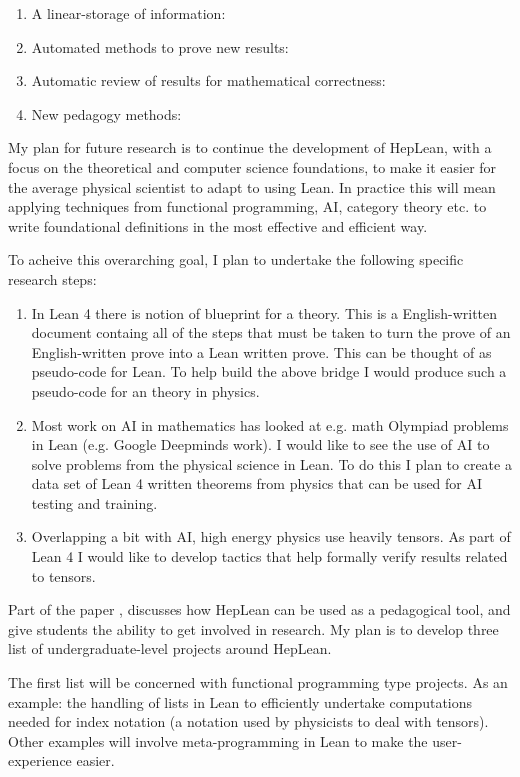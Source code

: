 \documentclass[14pt,letter]{article}
\newcounter{customtitle}
\begin{document}
\begin{enumerate}
\item A linear-storage of information:
\item Automated methods to prove new results:
\item Automatic review of results for mathematical correctness: 
\item New pedagogy methods:	
\end{enumerate}

My plan for future research is to continue the development of HepLean, with a focus on the theoretical and computer science foundations, to make it easier for the average physical scientist to adapt to using Lean. In practice this will mean applying techniques from functional programming, AI, category theory etc. to write foundational definitions in the most effective and efficient way. 

To acheive this overarching goal, I plan to undertake the following specific research steps:  
\begin{enumerate}
\item In Lean 4 there is notion of blueprint for a theory. This is 
a English-written document containg all of the steps that must be taken
to turn the prove of an English-written prove into a Lean written prove. 
This can be thought of as pseudo-code for Lean. To help build the above 
bridge I would produce such a pseudo-code for an theory in physics.
\item Most work on AI in mathematics has looked at e.g. math Olympiad problems
in Lean (e.g. Google Deepminds work). I would like to see the use 
of AI to solve problems from the physical science in Lean. To do this 
I plan to create a data set of Lean 4 written theorems from physics 
that can be used for AI testing and training.
\item Overlapping a bit with AI, high energy physics use heavily tensors. 
As part of Lean 4 I would like to develop tactics that help formally verify 
results related to tensors.
\end{enumerate}



Part of the paper , discusses how HepLean can be used 
as a pedagogical tool, and give students the ability to get involved in research.  My plan is to develop three list of undergraduate-level projects around HepLean. 

The first list will be concerned with functional programming type projects. As an example: the handling of lists in Lean to efficiently undertake computations needed for index notation (a notation used by physicists to deal with tensors). Other examples will involve meta-programming in Lean to make the user-experience easier.
\end{document}
